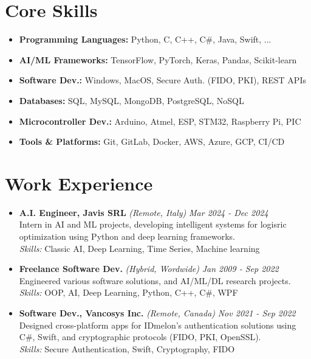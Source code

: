 \documentclass[a4paper]{article}
\begin{document}
\begin{paracol}{2}
\section*{Core Skills}
\begin{itemize}[left=0pt]
\setlength\itemsep{-0.3em}
    \item \textbf{Programming Languages:} Python, C, C++, C\#, Java, Swift, ...
    \item \textbf{AI/ML Frameworks:} TensorFlow, PyTorch, Keras, Pandas, Scikit-learn
    \item \textbf{Software Dev.:} Windows, MacOS, Secure Auth. (FIDO, PKI), REST APIs
    \item \textbf{Databases:} SQL, MySQL, MongoDB, PostgreSQL, NoSQL
    \item \textbf{Microcontroller Dev.:} Arduino, Atmel, ESP, STM32, Raspberry Pi, PIC
    \item \textbf{Tools \& Platforms:} Git, GitLab, Docker, AWS, Azure, GCP, CI/CD
\end{itemize}


\section*{Work Experience}

\begin{itemize}[left=0pt]
    \item \textbf{A.I. Engineer, Javis SRL} \textit{\fontsize{8}{0}\selectfont (Remote, Italy)} \hfill \textit{Mar 2024 - Dec 2024} \\
    Intern in AI and ML projects, developing intelligent systems for logisric optimization using Python and deep learning frameworks. 
    \\ \textit{Skills:} Classic AI, Deep Learning, Time Series, Machine learning

    \item \textbf{Freelance Software Dev.} \textit{\fontsize{8}{0}\selectfont (Hybrid, Wordwide)} \hfill \textit{Jan 2009 - Sep 2022} \\
    Engineered various software solutions, and AI/ML/DL research projects.
     \\ \textit{Skills:} OOP, AI, Deep Learning, Python, C++, C\#, WPF

    \item \textbf{Software Dev., Vancosys Inc.} \textit{\fontsize{8}{0}\selectfont (Remote, Canada)} \hfill \textit{Nov 2021 - Sep 2022} \\
    Designed cross-platform apps for IDmelon’s authentication solutions using C\#, Swift, and cryptographic protocols (FIDO, PKI, OpenSSL). 
    \\ \textit{Skills:} Secure Authentication, Swift, Cryptography, FIDO
    

\end{itemize}
\end{paracol}
\end{document}
